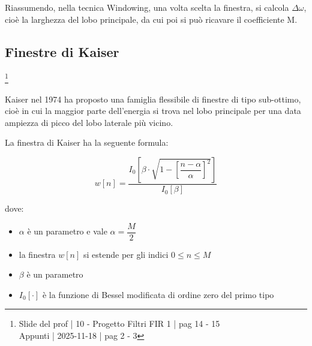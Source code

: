 Riassumendo, nella tecnica Windowing, una volta scelta la finestra, si calcola $\Delta \omega$, cioè la larghezza del lobo principale, da cui poi si può ricavare il coefficiente M. \newline 

\newpage 

\subsection{Finestre di Kaiser}

\footnote{ 
    Slide del prof | 10 - Progetto Filtri FIR 1 | pag 14 - 15 \\
    Appunti | 2025-11-18 | pag 2 - 3
}  

Kaiser nel 1974 ha proposto una famiglia flessibile di finestre di tipo sub-ottimo, cioè in cui la maggior parte dell'energia si trova nel lobo principale per una data ampiezza di picco 
del lobo laterale più vicino. \newline 

La finestra di Kaiser ha la seguente formula: 

{
    \Large 
    \begin{equation}
        w \left[ n\right] 
        = 
        \dfrac{
            I_0 \left[ 
                \beta 
                \cdot 
                \sqrt{
                    1 
                    - 
                    \left[ 
                        \dfrac{n - \alpha}{\alpha}
                    \right]^{2}
                }
            \right]
        }{I_0 \left[ \beta\right]}
    \end{equation}
}


dove: 

\begin{itemize}
    \item $\alpha$ è un parametro e vale $\alpha = \dfrac{M}{2}$ 
    \item la finestra $w \left[ n\right]$ si estende per gli indici $0 \leq n \leq M$ 
    \item $\beta$ è un parametro 
    \item $I_0 \left[ \cdot\right]$ è la funzione di Bessel modificata di ordine zero del primo tipo 
\end{itemize}


